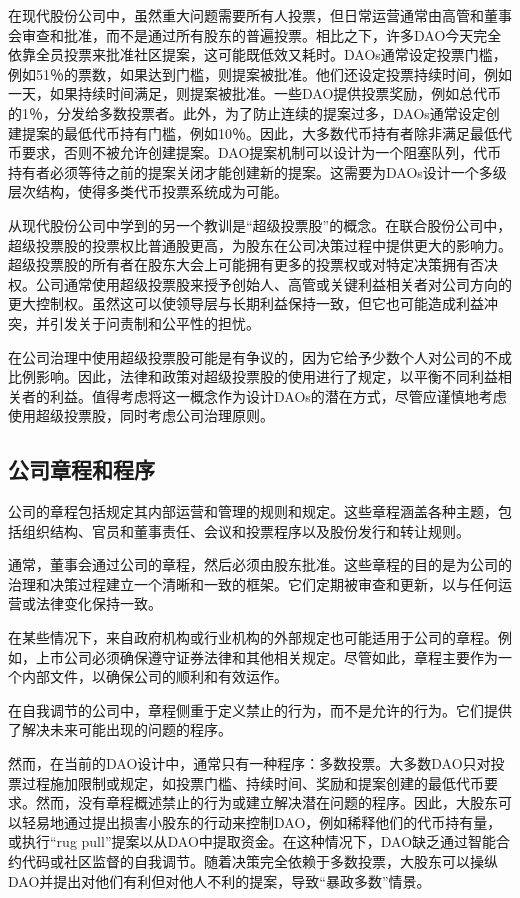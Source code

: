 \documentclass[main.tex]{subfiles}
\begin{document}
在现代股份公司中，虽然重大问题需要所有人投票，但日常运营通常由高管和董事会审查和批准，而不是通过所有股东的普遍投票。相比之下，许多DAO今天完全依靠全员投票来批准社区提案，这可能既低效又耗时。DAOs通常设定投票门槛，例如51％的票数，如果达到门槛，则提案被批准。他们还设定投票持续时间，例如一天，如果持续时间满足，则提案被批准。一些DAO提供投票奖励，例如总代币的1％，分发给多数投票者。此外，为了防止连续的提案过多，DAOs通常设定创建提案的最低代币持有门槛，例如10％。因此，大多数代币持有者除非满足最低代币要求，否则不被允许创建提案。DAO提案机制可以设计为一个阻塞队列，代币持有者必须等待之前的提案关闭才能创建新的提案。这需要为DAOs设计一个多级层次结构，使得多类代币投票系统成为可能。

从现代股份公司中学到的另一个教训是``超级投票股''的概念。在联合股份公司中，超级投票股的投票权比普通股更高，为股东在公司决策过程中提供更大的影响力。超级投票股的所有者在股东大会上可能拥有更多的投票权或对特定决策拥有否决权。公司通常使用超级投票股来授予创始人、高管或关键利益相关者对公司方向的更大控制权。虽然这可以使领导层与长期利益保持一致，但它也可能造成利益冲突，并引发关于问责制和公平性的担忧。

在公司治理中使用超级投票股可能是有争议的，因为它给予少数个人对公司的不成比例影响。因此，法律和政策对超级投票股的使用进行了规定，以平衡不同利益相关者的利益。值得考虑将这一概念作为设计DAOs的潜在方式，尽管应谨慎地考虑使用超级投票股，同时考虑公司治理原则。

\subsection{公司章程和程序}

公司的章程包括规定其内部运营和管理的规则和规定。这些章程涵盖各种主题，包括组织结构、官员和董事责任、会议和投票程序以及股份发行和转让规则。

通常，董事会通过公司的章程，然后必须由股东批准。这些章程的目的是为公司的治理和决策过程建立一个清晰和一致的框架。它们定期被审查和更新，以与任何运营或法律变化保持一致。

在某些情况下，来自政府机构或行业机构的外部规定也可能适用于公司的章程。例如，上市公司必须确保遵守证券法律和其他相关规定。尽管如此，章程主要作为一个内部文件，以确保公司的顺利和有效运作。

在自我调节的公司中，章程侧重于定义禁止的行为，而不是允许的行为。它们提供了解决未来可能出现的问题的程序。

然而，在当前的DAO设计中，通常只有一种程序：多数投票。大多数DAO只对投票过程施加限制或规定，如投票门槛、持续时间、奖励和提案创建的最低代币要求。然而，没有章程概述禁止的行为或建立解决潜在问题的程序。因此，大股东可以轻易地通过提出损害小股东的行动来控制DAO，例如稀释他们的代币持有量，或执行“rug pull”提案以从DAO中提取资金。在这种情况下，DAO缺乏通过智能合约代码或社区监督的自我调节。随着决策完全依赖于多数投票，大股东可以操纵DAO并提出对他们有利但对他人不利的提案，导致“暴政多数”情景。
\end{document}
